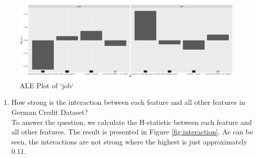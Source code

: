 \documentclass[
]{article}
\newenvironment{Shaded}{\begin{snugshade}}{\end{snugshade}}
\newcommand{\DataTypeTok}[1]{\textcolor[rgb]{0.13,0.29,0.53}{#1}}
\newcommand{\KeywordTok}[1]{\textcolor[rgb]{0.13,0.29,0.53}{\textbf{#1}}}
\newcommand{\NormalTok}[1]{#1}
\newcommand{\OperatorTok}[1]{\textcolor[rgb]{0.81,0.36,0.00}{\textbf{#1}}}
\newcommand{\StringTok}[1]{\textcolor[rgb]{0.31,0.60,0.02}{#1}}
\providecommand{\tightlist}{%
  \setlength{\itemsep}{0pt}\setlength{\parskip}{0pt}}
\begin{document}
\begin{Shaded}
\end{Shaded}

\begin{figure}

{\centering \includegraphics[width=0.8\linewidth]{plots/ale_job} 

}

\caption{ALE Plot of `job`}\label{fig:ale-job}
\end{figure}

\begin{enumerate}
\def\labelenumi{\arabic{enumi}.}
\setcounter{enumi}{6}
\tightlist
\item
  How strong is the interaction between each feature and all other features in German Credit Dataset?\\
  To answer the question, we calculate the H-statistic between each feature and all other features. The result is presented in Figure \ref{fig:interaction}. As can be seen, the interactions are not strong where the highest is just approximately 0.11.
\end{enumerate}

\begin{Shaded}
\end{Shaded}
\end{document}
